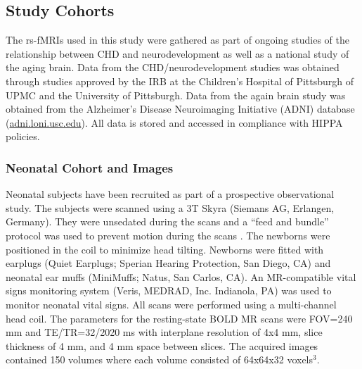 \subsection{Study Cohorts}

The rs-fMRIs used in this study were gathered as part of ongoing studies of the relationship between CHD and neurodevelopment as well as a national study of the aging brain. Data from the CHD/neurodevelopment studies was obtained through studies approved by the IRB at the Children's Hospital of Pittsburgh of UPMC and the University of Pittsburgh. Data from the again brain study was obtained from the Alzheimer's Disease Neuroimaging Initiative (ADNI) database (\href{adni.loni.usc.edu}{adni.loni.usc.edu}). All data is stored and accessed in compliance with HIPPA policies.

\subsubsection{Neonatal Cohort and Images}

Neonatal subjects have been recruited as part of a prospective observational study. The subjects were scanned using a 3T Skyra (Siemans AG, Erlangen, Germany). They were unsedated during the scans and a ``feed and bundle'' protocol was used to prevent motion during the scans \cite{Windram2011}. The newborns were positioned in the coil to minimize head tilting. Newborns were fitted with earplugs (Quiet Earplugs; Sperian Hearing Protection, San Diego, CA) and neonatal ear muffs (MiniMuffs; Natus, San Carlos, CA). An MR-compatible vital signs monitoring system (Veris, MEDRAD, Inc. Indianola, PA) was used to monitor neonatal vital signs. All scans were performed using a multi-channel head coil. The parameters for the resting-state BOLD MR scans were FOV=240 mm and TE/TR=32/2020 ms with interplane resolution of 4x4 mm, slice thickness of 4 mm, and 4 mm space between slices. The acquired images contained 150 volumes where each volume consisted of 64x64x32 voxels$^3$.


